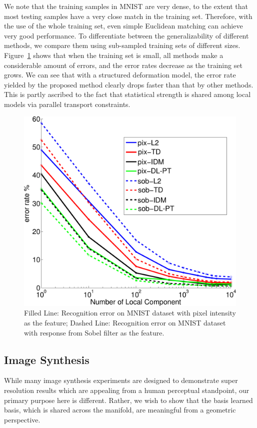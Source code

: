 We note that the training samples in MNIST are very dense, to the
extent that most testing samples have a very close match in the
training set. Therefore, with the use of the whole training set,
even simple Euclidean matching can achieve very good performance.
To differentiate between the generalizability of different methods,
we compare them using sub-sampled training sets of different sizes. 
%
Figure~\ref{fig:char_reg} shows that when the training set is small,
all methods make a considerable amount of errors, and the error rates
decrease as the training set grows. We can see that with a structured
deformation model, the error rate yielded by the proposed method
clearly drops faster than that by other methods. This is partly
ascribed to the fact that statistical strength is shared among local
models via parallel transport constraints.
\begin{figure}[t]
    \centering
    \includegraphics[height=0.7\columnwidth]{figs/f1_err1.pdf}
    \caption{Filled Line: Recognition error on MNIST dataset with pixel intensity as the feature;
      Dashed Line: Recognition error on MNIST dataset with response from Sobel filter as the feature.}   
    \label{fig:char_reg}
\end{figure}


\subsection{Image Synthesis}
%
While many image synthesis experiments are designed to demonstrate
super resolution results which are appealing from a human perceptual
standpoint, our primary purpose here is different. Rather, we wish to
show that the basis learned basis, which is shared across the manifold, are meaningful
from a geometric perspective.

